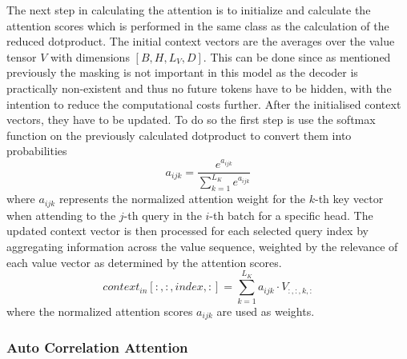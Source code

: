\documentclass{article}
\begin{document}
The next step in calculating the attention is to initialize and calculate the attention scores which is performed in the same class as the calculation of the reduced dotproduct. The initial context vectors are the averages over the value tensor $V$ with dimensions $[B,H,L_V,D]$. This can be done since as mentioned previously the masking is not important in this model as the decoder is practically non-existent and thus no future tokens have to be hidden, with the intention to reduce the computational costs further. After the initialised context vectors, they have to be updated. To do so the first step is use the softmax function on the previously calculated dotproduct to convert them into probabilities
\begin{equation}
    a_{ijk} = \frac{e^{a_{ijk}}}{\sum^{L_K}_{k=1}e^{a_{ijk}}}
\end{equation}
where $a_{ijk}$ represents the normalized attention weight for the $k$-th key vector when attending to the $j$-th query in the $i$-th batch for a specific head. The updated context vector is then processed for each selected query index by aggregating information across the value sequence, weighted by the relevance of each value vector as determined by the attention scores.
\begin{equation}
    context_{in}[:,:,index,:] = \sum^{L_K}_{k=1} a_{ijk} \cdot V_{:,:,k,:}
\end{equation}
where the normalized attention scores $a_{ijk}$ are used as weights.


\subsubsection{Auto Correlation Attention}

\newpage

\printbibliography
\end{document}
